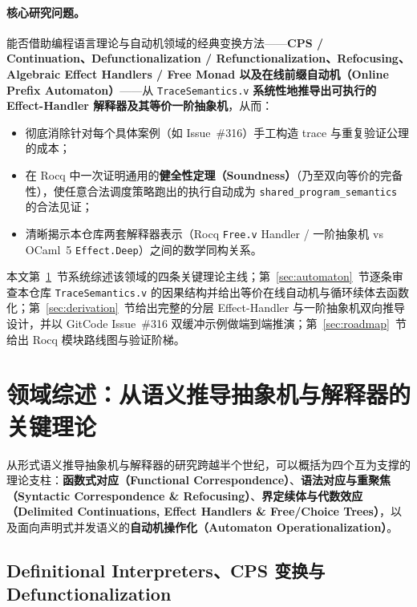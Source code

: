 \documentclass[UTF8,a4paper,11pt,fontset=fandol]{ctexart}
\newcommand{\code}[1]{\texttt{#1}}
\begin{document}
\paragraph{核心研究问题。}
能否借助编程语言理论与自动机领域的经典变换方法——\textbf{CPS / Continuation、Defunctionalization / Refunctionalization、Refocusing、Algebraic Effect Handlers / Free Monad 以及在线前缀自动机（Online Prefix Automaton）}——从 \code{TraceSemantics.v} \textbf{系统性地推导出可执行的 Effect-Handler 解释器及其等价一阶抽象机}，从而：
\begin{itemize}
\item 彻底消除针对每个具体案例（如 Issue~\#316）手工构造 trace 与重复验证公理的成本；
\item 在 Rocq 中一次证明通用的\textbf{健全性定理（Soundness）}（乃至双向等价的完备性），使任意合法调度策略跑出的执行自动成为 \code{shared\_program\_semantics} 的合法见证；
\item 清晰揭示本仓库两套解释器表示（Rocq \code{Free.v} Handler / 一阶抽象机 vs OCaml~5 \code{Effect.Deep}）之间的数学同构关系。
\end{itemize}

本文第~\ref{sec:survey}~节系统综述该领域的四条关键理论主线；第~\ref{sec:automaton}~节逐条审查本仓库 \code{TraceSemantics.v} 的因果结构并给出等价在线自动机与循环续体去函数化；第~\ref{sec:derivation}~节给出完整的分层 Effect-Handler 与一阶抽象机双向推导设计，并以 GitCode Issue~\#316 双缓冲示例做端到端推演；第~\ref{sec:roadmap}~节给出 Rocq 模块路线图与验证阶梯。

\section{领域综述：从语义推导抽象机与解释器的关键理论}
\label{sec:survey}

从形式语义推导抽象机与解释器的研究跨越半个世纪，可以概括为四个互为支撑的理论支柱：\textbf{函数式对应（Functional Correspondence）}、\textbf{语法对应与重聚焦（Syntactic Correspondence \& Refocusing）}、\textbf{界定续体与代数效应（Delimited Continuations, Effect Handlers \& Free/Choice Trees）}，以及面向声明式并发语义的\textbf{自动机操作化（Automaton Operationalization）}。

\subsection{Definitional Interpreters、CPS 变换与 Defunctionalization}
\end{document}
